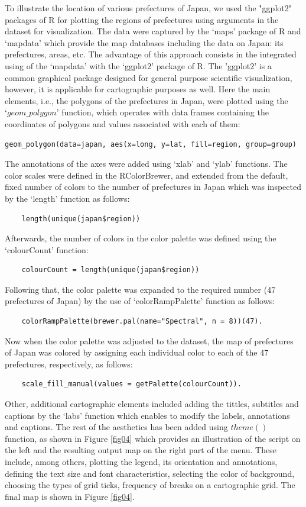 \documentclass[land,article,submit,pdftex,moreauthors]{Definitions/mdpi}
\begin{document}
To illustrate the location of various prefectures of Japan, we used the "ggplot2" packages of R for plotting the regions of prefectures using arguments in the dataset for visualization. The data were captured by the ‘maps’ package of R \cite{Beckeretal2013} and ‘mapdata’ which provide the map databases including the data on Japan: its prefectures, areas, etc. The advantage of this approach consists in the integrated using of the ‘mapdata’ with the ‘ggplot2’ package of R. The 'ggplot2' is a common graphical package designed for general purpose scientific visualization, however, it is applicable for cartographic purposes as well. Here the main elements, i.e., the polygons of the prefectures in Japan, were plotted using the $‘geom\_polygon’$ function, which operates with data frames containing the coordinates of polygons and values associated with each of them: 
\begin{verbatim}geom_polygon(data=japan, aes(x=long, y=lat, fill=region, group=group)\end{verbatim} 

The annotations of the axes were added using ‘xlab’ and ‘ylab’ functions. The color scales were defined in the RColorBrewer, and extended from the default, fixed number of colors to the number of prefectures in Japan which was inspected by the ‘length’ function as follows: 
\begin{verbatim}
	length(unique(japan$region))
\end{verbatim} 
Afterwards, the number of colors in the color palette was defined using the ‘colourCount’ function: 
\begin{verbatim}
	colourCount = length(unique(japan$region))
\end{verbatim}

Following that, the color palette was expanded to the required number (47 prefectures of Japan) by the use of ‘colorRampPalette’ function as follows: 
\begin{verbatim}
	colorRampPalette(brewer.pal(name="Spectral", n = 8))(47).
\end{verbatim}  
Now when the color palette was adjusted to the dataset, the map of prefectures of Japan was colored by assigning each individual color to each of the 47 prefectures, respectively, as follows: 
\begin{verbatim}
	scale_fill_manual(values = getPalette(colourCount)).
\end{verbatim} 
Other, additional cartographic elements included adding the tittles, subtitles and captions by the ‘labs’ function which enables to modify the labels, annotations and captions. The rest of the aesthetics has been added using $theme()$ function, as shown in Figure \ref{fig04} which provides an illustration of the script on the left and the resulting output map on the right part of the menu. These include, among others, plotting the legend, its orientation and annotations, defining the text size and font characteristics, selecting the color of background, choosing the types of grid ticks, frequency of breaks on a cartographic grid. The final map is shown in Figure \ref{fig04}. 
\end{document}
